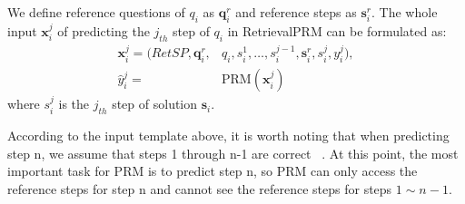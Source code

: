 
We define reference questions of $q_i$ as $\mathbf{q}_i^{r}$ and reference steps as $\mathbf{s}_i^r$. The whole input $\mathbf{x}_i^j$ of predicting the $j_{th}$ step of $q_i$ in RetrievalPRM can be formulated as:
\begin{equation}
\label{input template}
    \begin{aligned}
    \mathbf{x}^j_i = (RetSP,\mathbf{q}^r_i,&q_i,
    s^1_i,\ldots,s^{j-1}_i,\mathbf{s}^r_i,s^j_i,y^j_i),\\
    \hat{y}^j_i = & \text{PRM}(\mathbf{x}^j_i)
    \end{aligned}
\end{equation}
where $s^j_i$ is the $j_{th}$ step of solution $\mathbf{s}_i$.

According to the input template above, it is worth noting that when predicting step n, we assume that steps 1 through n-1 are correct ~\cite{luo2024improvemathematicalreasoninglanguage,zheng2024processbench}. At this point, the most important task for PRM is to predict step n, so PRM can only access the reference steps for step n and cannot see the reference steps for steps $1\sim n-1$.


